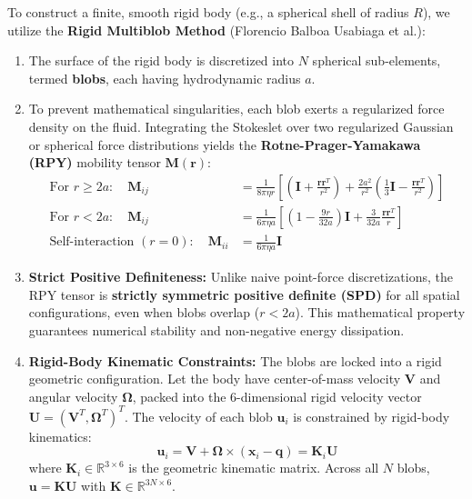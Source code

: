 \documentclass[11pt,a4paper]{article}
\begin{document}
To construct a finite, smooth rigid body (e.g., a spherical shell of radius $R$), we utilize the \textbf{Rigid Multiblob Method} (Florencio Balboa Usabiaga et al.):
\begin{enumerate}
    \item The surface of the rigid body is discretized into $N$ spherical sub-elements, termed \textbf{blobs}, each having hydrodynamic radius $a$.
    \item To prevent mathematical singularities, each blob exerts a regularized force density on the fluid. Integrating the Stokeslet over two regularized Gaussian or spherical force distributions yields the \textbf{Rotne-Prager-Yamakawa (RPY)} mobility tensor $\mathbf{M}(\mathbf{r})$:
    \begin{align}
        \text{For } r \ge 2a: \quad \mathbf{M}_{ij} &= \frac{1}{8\pi\eta r} \left[ \left(\mathbf{I} + \frac{\mathbf{r}\mathbf{r}^T}{r^2}\right) + \frac{2a^2}{r^2}\left(\frac{1}{3}\mathbf{I} - \frac{\mathbf{r}\mathbf{r}^T}{r^2}\right) \right] \label{eq:rpy_nonoverlap} \\
        \text{For } r < 2a: \quad \mathbf{M}_{ij} &= \frac{1}{6\pi\eta a} \left[ \left(1 - \frac{9r}{32a}\right)\mathbf{I} + \frac{3}{32a}\frac{\mathbf{r}\mathbf{r}^T}{r} \right] \label{eq:rpy_overlap} \\
        \text{Self-interaction } (r = 0): \quad \mathbf{M}_{ii} &= \frac{1}{6\pi\eta a} \mathbf{I} \label{eq:rpy_self}
    \end{align}
    \item \textbf{Strict Positive Definiteness:} Unlike naive point-force discretizations, the RPY tensor is \textbf{strictly symmetric positive definite (SPD)} for all spatial configurations, even when blobs overlap ($r < 2a$). This mathematical property guarantees numerical stability and non-negative energy dissipation.
    \item \textbf{Rigid-Body Kinematic Constraints:} The blobs are locked into a rigid geometric configuration. Let the body have center-of-mass velocity $\mathbf{V}$ and angular velocity $\mathbf{\Omega}$, packed into the 6-dimensional rigid velocity vector $\mathbf{U} = (\mathbf{V}^T, \mathbf{\Omega}^T)^T$. The velocity of each blob $\mathbf{u}_i$ is constrained by rigid-body kinematics:
    \begin{equation}
        \mathbf{u}_i = \mathbf{V} + \mathbf{\Omega} \times (\mathbf{x}_i - \mathbf{q}) = \mathbf{K}_i \mathbf{U}
    \end{equation}
    where $\mathbf{K}_i \in \mathbb{R}^{3 \times 6}$ is the geometric kinematic matrix. Across all $N$ blobs, $\mathbf{u} = \mathbf{K} \mathbf{U}$ with $\mathbf{K} \in \mathbb{R}^{3N \times 6}$.

\end{enumerate}
\end{document}
